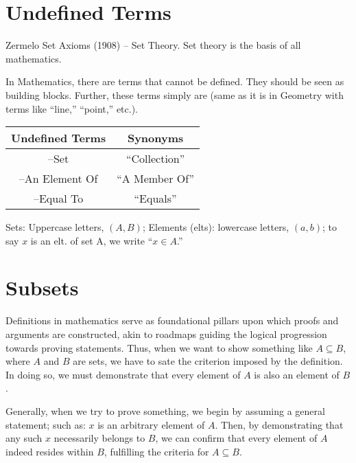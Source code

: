 \renewcommand{\theenumi}{\arabic{enumi}}
\renewcommand{\labelenumi}{\theenumi.}
\section{Undefined Terms}

Zermelo Set Axioms (1908) -- Set Theory. 
Set theory is the basis of all mathematics. 

In Mathematics, there are terms that cannot be defined. They should be seen as building blocks. Further, these terms simply are (same as it is in Geometry with terms like ``line,'' ``point,'' etc.).

\begin{center}
    \begin{tabular}{c|c}
        \textbf{Undefined Terms} & \textbf{Synonyms} \\
        \hline
        --Set                    & ``Collection''    \\
        \hline
        --An Element Of          & ``A Member Of''   \\
        \hline
        --Equal To               & ``Equals''        
    \end{tabular}
\end{center}



\begin{note}
    Sets: Uppercase letters, \((A, B)\);
    Elements (elts): lowercase letters, \((a, b)\);
    to say \(x\) is an elt. of set A, we write ``\(x \in A\).''
\end{note}

\pfs

\renewcommand{\theenumi}{\arabic{enumi}}
\renewcommand{\labelenumi}{\theenumi.}
\section{Subsets}

Definitions in mathematics serve as foundational pillars upon which proofs and arguments are constructed, akin to roadmaps guiding the logical progression towards proving statements. Thus, when we want to show something like \( A \subseteq B \), where \( A \) and \( B \) are sets, we have to sate the criterion imposed by the definition. In doing so, we must demonstrate that every element of \( A \) is also an element of \( B \).

Generally, when we try to prove something, we begin by assuming a general statement; such as: \( x \) is an arbitrary element of \( A \). Then, by demonstrating that any such \( x \) necessarily belongs to \( B \), we can confirm that every element of \( A \) indeed resides within \( B \), fulfilling the criteria for \( A \subseteq B \).

